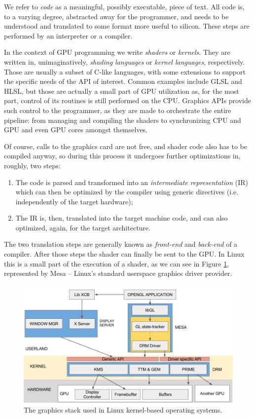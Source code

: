 \documentclass[11pt, conference, onecolumn, final]{IEEEtran}
\begin{document}
We refer to \textit{code} as a meaningful, possibly executable, piece of text.
All code is, to a varying degree, abstracted away for the programmer, and needs
to be understood and translated to some format more useful to silicon.
These steps are performed by an interpreter or a compiler.

In the context of GPU programming we write \textit{shaders} or \textit{kernels}.
They are written in, unimaginatively, \textit{shading languages} or
\textit{kernel languages}, respectively.
Those are usually a subset of C-like languages, with some extensions to support
the specific needs of the API of interest.
Common examples include GLSL and HLSL, but those are actually a small part of
GPU utilization as, for the most part, control of its routines is still
performed on the CPU.
Graphics APIs provide such control to the programmer, as they are made to
orchestrate the entire pipeline: from managing and compiling the shaders to
synchronizing CPU and GPU and even GPU cores amongst themselves.

Of course, calls to the graphics card are not free, and shader code also has to
be compiled anyway, so during this process it undergoes further optimizations
in, roughly, two steps:
\begin{enumerate}
    \item The code is parsed and transformed into an \textit{intermediate
        representation} (IR) which can then be optimized by the compiler using
        generic directives (i.e. independently of the target hardware);
    \item The IR is, then, translated into the target machine code, and can
        also optimized, again, for the target architecture.
\end{enumerate}
The two translation steps are generally known as \textit{front-end} and
\textit{back-end} of a compiler. After those steps the shader can finally be
sent to the GPU.
In Linux this is a small part of the execution of a shader, as we can see in
Figure \cref{fig:linux-gs}, represented by Mesa -- Linux's standard userspace
graphics driver provider.

\begin{figure}[H]
    \centering
    \includegraphics[width=0.8\linewidth]{linux-stack.jpeg}
    \caption{The graphics stack used in Linux kernel-based operating systems.}
    \label{fig:linux-gs}
    \end{figure}
\end{document}
